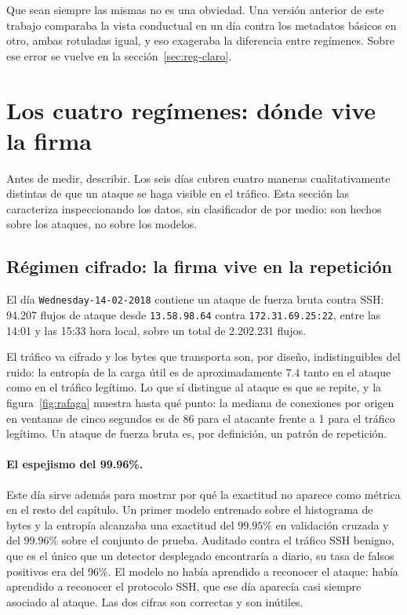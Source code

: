 Que sean siempre las mismas no es una obviedad. Una versión anterior de este
trabajo comparaba la vista conductual en un día contra los metadatos básicos en
otro, ambas rotuladas igual, y eso exageraba la diferencia entre regímenes.
Sobre ese error se vuelve en la sección~\ref{sec:reg-claro}.

\section{Los cuatro regímenes: dónde vive la firma}
\label{sec:regimenes-descriptivo}

Antes de medir, describir. Los seis días cubren cuatro maneras
cualitativamente distintas de que un ataque se haga visible en el tráfico. Esta
sección las caracteriza inspeccionando los datos, sin clasificador de por medio:
son hechos sobre los ataques, no sobre los modelos.

\subsection{Régimen cifrado: la firma vive en la repetición}
\label{sec:reg-cifrado}

El día \texttt{Wednesday-14-02-2018} contiene un ataque de fuerza bruta contra
SSH: 94.207 flujos de ataque desde \texttt{13.58.98.64} contra
\texttt{172.31.69.25:22}, entre las 14:01 y las 15:33 hora local, sobre un total
de 2.202.231 flujos.

El tráfico va cifrado y los bytes que transporta son, por diseño,
indistinguibles del ruido: la entropía de la carga útil es de aproximadamente
$7.4$ tanto en el ataque como en el tráfico legítimo. Lo que sí distingue al
ataque es que se repite, y la figura~\ref{fig:rafaga} muestra hasta qué punto:
la mediana de conexiones por origen en ventanas de cinco segundos es de 86 para
el atacante frente a 1 para el tráfico legítimo. Un ataque de fuerza bruta es,
por definición, un patrón de repetición.

\paragraph{El espejismo del 99.96\%.} Este día sirve además para mostrar por qué
la exactitud no aparece como métrica en el resto del capítulo. Un primer modelo
entrenado sobre el histograma de bytes y la entropía alcanzaba una exactitud del
$99.95\%$ en validación cruzada y del $99.96\%$ sobre el conjunto de prueba.
Auditado contra el tráfico SSH benigno, que es el único que un detector
desplegado encontraría a diario, su tasa de falsos positivos era del 96\%. El
modelo no había aprendido a reconocer el ataque: había aprendido a reconocer el
protocolo SSH, que ese día aparecía casi siempre asociado al ataque. Las dos
cifras son correctas y son inútiles.

